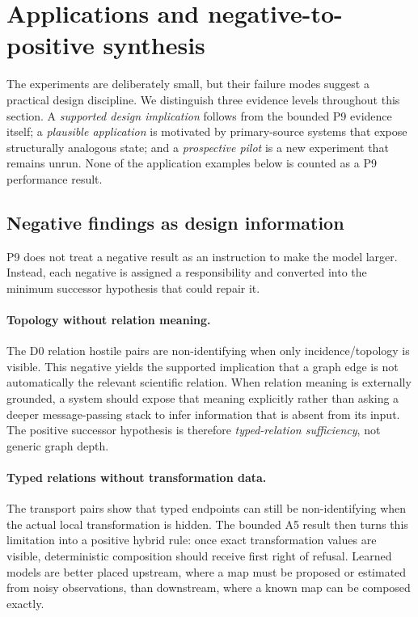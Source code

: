 \section{Applications and negative-to-positive synthesis}

The experiments are deliberately small, but their failure modes suggest a practical design discipline. We distinguish three evidence levels throughout this section. A \emph{supported design implication} follows from the bounded P9 evidence itself; a \emph{plausible application} is motivated by primary-source systems that expose structurally analogous state; and a \emph{prospective pilot} is a new experiment that remains unrun. None of the application examples below is counted as a P9 performance result.

\subsection{Negative findings as design information}

P9 does not treat a negative result as an instruction to make the model larger. Instead, each negative is assigned a responsibility and converted into the minimum successor hypothesis that could repair it.

\paragraph{Topology without relation meaning.}
The D0 relation hostile pairs are non-identifying when only incidence/topology is visible. This negative yields the supported implication that a graph edge is not automatically the relevant scientific relation. When relation meaning is externally grounded, a system should expose that meaning explicitly rather than asking a deeper message-passing stack to infer information that is absent from its input. The positive successor hypothesis is therefore \emph{typed-relation sufficiency}, not generic graph depth.

\paragraph{Typed relations without transformation data.}
The transport pairs show that typed endpoints can still be non-identifying when the actual local transformation is hidden. The bounded A5 result then turns this limitation into a positive hybrid rule: once exact transformation values are visible, deterministic composition should receive first right of refusal. Learned models are better placed upstream, where a map must be proposed or estimated from noisy observations, than downstream, where a known map can be composed exactly.

